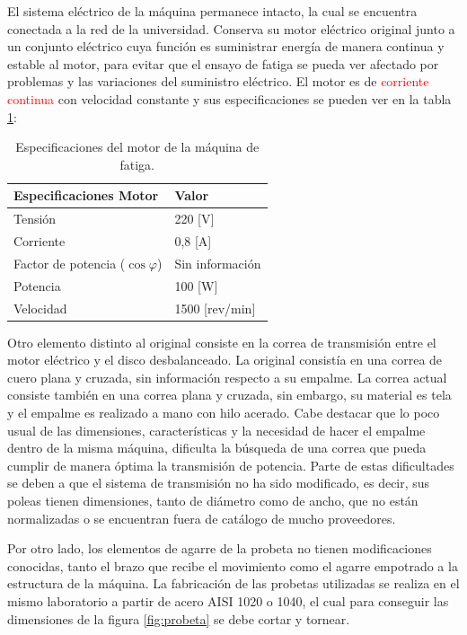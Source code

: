 El sistema eléctrico de la máquina permanece intacto, la cual se encuentra conectada a la red de la universidad. Conserva su motor eléctrico original junto a un conjunto eléctrico cuya función es suministrar energía de manera continua y estable al motor, para evitar que el ensayo de fatiga se pueda ver afectado por problemas y las variaciones del suministro eléctrico. El motor es de \textcolor{red}{corriente continua} con velocidad constante y sus especificaciones se pueden ver en la tabla \ref{tab:motor_maq}:

\begin{table}[h]
\centering
\begin{tabular}{ll}
\hline
Especificaciones Motor                            & Valor   				\\ \hline
Tensión                                           & 220 {[}V{]}        		\\
Corriente                                         & 0,8 {[}A{]}        		\\
Factor de potencia ($\cos \varphi$)				  & Sin información    		\\
Potencia                                          & 100 {[}W{]}        		\\
Velocidad                                         & 1500 {[}rev/min{]} 		\\ \hline
\end{tabular}
\caption{Especificaciones del motor de la máquina de fatiga.}
\label{tab:motor_maq}
\end{table}

Otro elemento distinto al original consiste en la correa de transmisión entre el motor eléctrico y el disco desbalanceado. La original consistía en una correa de cuero plana y cruzada, sin información respecto a su empalme. La correa actual consiste también en una correa plana y cruzada, sin embargo, su material es tela y el empalme es realizado a mano con hilo acerado. Cabe destacar que lo poco usual de las dimensiones, características y la necesidad de hacer el empalme dentro de la misma máquina, dificulta la búsqueda de una correa que pueda cumplir de manera óptima la transmisión de potencia. Parte de estas dificultades se deben a que el sistema de transmisión no ha sido modificado, es decir, sus poleas tienen dimensiones, tanto de diámetro como de ancho, que no están normalizadas o se encuentran fuera de catálogo de mucho proveedores. 

Por otro lado, los elementos de agarre de la probeta no tienen modificaciones conocidas, tanto el brazo que recibe el movimiento como el agarre empotrado a la estructura de la máquina. La fabricación de las probetas utilizadas se realiza en el mismo laboratorio a partir de acero AISI 1020 o 1040, el cual para conseguir las dimensiones de la figura \ref{fig:probeta} se debe cortar y tornear.

